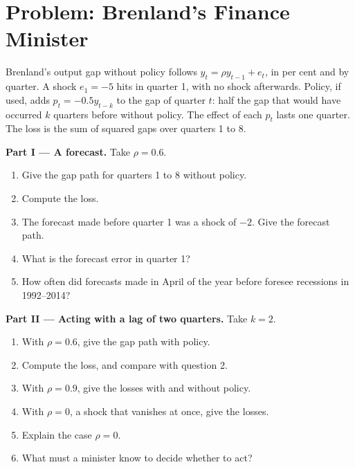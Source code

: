 \section{Problem: Brenland's Finance Minister}\label{sec:b1:stabilisation-policy:problem}

\begin{problem}\label{pb:b1:stabilisation-policy:brenland}
Brenland's output gap without policy follows $y_t = \rho y_{t-1} + e_t$, in per cent and by
quarter. A shock $e_1 = -5$ hits in quarter 1, with no shock afterwards. Policy, if
used, adds $p_t = -0.5y_{t-k}$ to the gap of quarter $t$: half the gap that would have
occurred $k$ quarters before without policy. The effect of each $p_t$ lasts one
quarter. The loss is the sum of squared gaps over quarters 1 to 8.

\medskip\noindent\textbf{Part I --- A forecast.} Take $\rho = 0.6$.
\begin{enumerate}
  \item Give the gap path for quarters 1 to 8 without policy.
  \item Compute the loss.
  \item The forecast made before quarter 1 was a shock of $-2$. Give the forecast path.
  \item What is the forecast error in quarter 1?
  \item How often did forecasts made in April of the year before foresee recessions in 1992--2014?
\end{enumerate}

\medskip\noindent\textbf{Part II --- Acting with a lag of two quarters.} Take $k = 2$.
\begin{enumerate}[resume]
  \item With $\rho = 0.6$, give the gap path with policy.
  \item Compute the loss, and compare with question 2.
  \item With $\rho = 0.9$, give the losses with and without policy.
  \item With $\rho = 0$, a shock that vanishes at once, give the losses.
  \item Explain the case $\rho = 0$.
  \item What must a minister know to decide whether to act?
\end{enumerate}


\end{problem}

